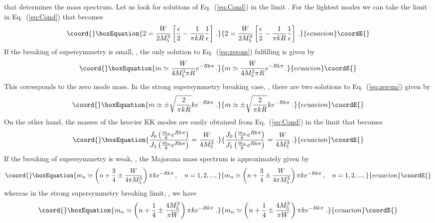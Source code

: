 \documentclass[a4paper,12pt]{article}
\begin{document}
that determines the mass spectrum.
Let us look for solutions of Eq.~(\ref{eq:Cond})
in the limit \coordHE{}. 
For the lightest modes
we can take
the limit  
 \coordHE{} 
in  Eq.~(\ref{eq:Cond})
that becomes
\begin{equation}\coord{}\boxEquation{
2 = \frac{W}{2 M_{5}^{3}} \left[\frac{\epsilon}{2} - \frac{1}{\pi k R}
    \frac{1}{\epsilon} \right]\, .
\label{eq:zerom}
}{
2 = \frac{W}{2 M_{5}^{3}} \left[\frac{\epsilon}{2} - \frac{1}{\pi k R}
    \frac{1}{\epsilon} \right]\, .
}{ecuacion}\coordE{}\end{equation}
If the breaking of supersymmetry is small,  \coordHE{},
the only solution to Eq.~(\ref{eq:zerom}) 
fulfilling \coordHE{} 
is given by
\begin{equation}\coord{}\boxEquation{
 m \simeq \frac{W}{4 M_{5}^{3} \pi R} e^{-Rk\pi}\, .
}{
 m \simeq \frac{W}{4 M_{5}^{3} \pi R} e^{-Rk\pi}\, .
}{ecuacion}\coordE{}\end{equation}
This corresponds to the zero mode mass.
In the strong supersymmetry breaking case, 
\coordHE{},
there are two solutions to Eq.~(\ref{eq:zerom}) given by
\begin{equation}\coord{}\boxEquation{
 m \simeq \pm\sqrt{\frac{2}{\pi k R}} k e^{-Rk\pi}\; .
}{
 m \simeq \pm\sqrt{\frac{2}{\pi k R}} k e^{-Rk\pi}\; .
}{ecuacion}\coordE{}\end{equation}
On the other hand, the masses of the  heavier KK modes are easily
obtained from Eq.~(\ref{eq:Cond})
 in the limit \coordHE{} that becomes
\begin{equation}\coord{}\boxEquation{
 \frac{J_0 \left(\frac{m_n}{k} e^{Rk\pi } \right)}{J_1
  \left(\frac{m_n}{k} e^{Rk\pi } \right)} = \frac{W}{4 M_{5}^{3}}\, .
}{
 \frac{J_0 \left(\frac{m_n}{k} e^{Rk\pi } \right)}{J_1
  \left(\frac{m_n}{k} e^{Rk\pi } \right)} = \frac{W}{4 M_{5}^{3}}\, .
}{ecuacion}\coordE{}\end{equation}
If the breaking of supersymmetry is weak, 
\coordHE{},
the Majorana mass spectrum is
approximately given by
 \begin{equation}\coord{}\boxEquation{
m_n \simeq 
\left(n + \frac{3}{4} \pm \frac{W}{4\pi M_{5}^{3}}\right) \pi k
   e^{-Rk\pi }\, , \ \ \ n=1,2,...,
}{
m_n \simeq 
\left(n + \frac{3}{4} \pm \frac{W}{4\pi M_{5}^{3}}\right) \pi k
   e^{-Rk\pi }\, , \ \ \ n=1,2,...,
}{ecuacion}\coordE{}\end{equation}
whereas in the strong supersymmetry breaking limit, 
\coordHE{}, we have
\begin{equation}\coord{}\boxEquation{
m_n \simeq \left(n + \frac{1}{4} 
\pm \frac{4 M_{5}^{3}}{\pi W}\right) \pi k
   e^{-Rk\pi }\; .
}{
m_n \simeq \left(n + \frac{1}{4} 
\pm \frac{4 M_{5}^{3}}{\pi W}\right) \pi k
   e^{-Rk\pi }\; .
}{ecuacion}\coordE{}\end{equation}
\end{document}
